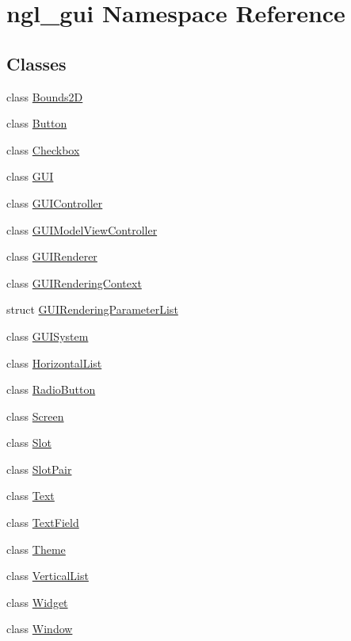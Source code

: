 \hypertarget{namespacengl__gui}{}\section{ngl\+\_\+gui Namespace Reference}
\label{namespacengl__gui}
\subsection*{Classes}
\begin{DoxyCompactItemize}
\item 
class \mbox{\hyperlink{classngl__gui_1_1_bounds2_d}{Bounds2D}}
\item 
class \mbox{\hyperlink{classngl__gui_1_1_button}{Button}}
\item 
class \mbox{\hyperlink{classngl__gui_1_1_checkbox}{Checkbox}}
\item 
class \mbox{\hyperlink{classngl__gui_1_1_g_u_i}{G\+UI}}
\item 
class \mbox{\hyperlink{classngl__gui_1_1_g_u_i_controller}{G\+U\+I\+Controller}}
\item 
class \mbox{\hyperlink{classngl__gui_1_1_g_u_i_model_view_controller}{G\+U\+I\+Model\+View\+Controller}}
\item 
class \mbox{\hyperlink{classngl__gui_1_1_g_u_i_renderer}{G\+U\+I\+Renderer}}
\item 
class \mbox{\hyperlink{classngl__gui_1_1_g_u_i_rendering_context}{G\+U\+I\+Rendering\+Context}}
\item 
struct \mbox{\hyperlink{structngl__gui_1_1_g_u_i_rendering_parameter_list}{G\+U\+I\+Rendering\+Parameter\+List}}
\item 
class \mbox{\hyperlink{classngl__gui_1_1_g_u_i_system}{G\+U\+I\+System}}
\item 
class \mbox{\hyperlink{classngl__gui_1_1_horizontal_list}{Horizontal\+List}}
\item 
class \mbox{\hyperlink{classngl__gui_1_1_radio_button}{Radio\+Button}}
\item 
class \mbox{\hyperlink{classngl__gui_1_1_screen}{Screen}}
\item 
class \mbox{\hyperlink{classngl__gui_1_1_slot}{Slot}}
\item 
class \mbox{\hyperlink{classngl__gui_1_1_slot_pair}{Slot\+Pair}}
\item 
class \mbox{\hyperlink{classngl__gui_1_1_text}{Text}}
\item 
class \mbox{\hyperlink{classngl__gui_1_1_text_field}{Text\+Field}}
\item 
class \mbox{\hyperlink{classngl__gui_1_1_theme}{Theme}}
\item 
class \mbox{\hyperlink{classngl__gui_1_1_vertical_list}{Vertical\+List}}
\item 
class \mbox{\hyperlink{classngl__gui_1_1_widget}{Widget}}
\item 
class \mbox{\hyperlink{classngl__gui_1_1_window}{Window}}
\end{DoxyCompactItemize}
